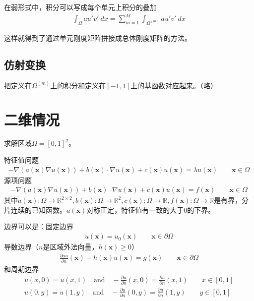 \documentclass[12pt,a4paper]{article}
\begin{document}
在弱形式中，积分可以写成每个单元上积分的叠加
\begin{align*}
\int_{\Omega} a u' v' \ dx = \sum_{m=1}^{M} \int_{\Omega^{(m)}} a u' v' \ dx
\end{align*}

这样就得到了通过单元刚度矩阵拼接成总体刚度矩阵的方法。

\subsection{仿射变换}

把定义在$\Omega^{(m)}$上的积分和定义在$[-1,1]$上的基函数对应起来。（略）







\section{二维情况}

求解区域$\Omega = [0,1]^2$。

特征值问题
\begin{align*}
- \nabla(a(\mathbf{x}) \nabla u(\mathbf{x})) + b(\mathbf{x}) \cdot \nabla u(\mathbf{x}) + c(\mathbf{x}) u(\mathbf{x}) = \lambda u(\mathbf{x}) \qquad \mathbf{x} \in \Omega
\end{align*}
源项问题
\begin{align*}
- \nabla(a(\mathbf{x}) \nabla u(\mathbf{x})) + b(\mathbf{x}) \cdot \nabla u(\mathbf{x}) + c(\mathbf{x}) u(\mathbf{x}) = f(\mathbf{\mathbf{x}}) \qquad \mathbf{x} \in \Omega
\end{align*}
其中$a(\mathbf{x}): \Omega \rightarrow \mathbb{R}^{2 \times 2}, b(\mathbf{x}): \Omega \rightarrow \mathbb{R}^{2}, c(\mathbf{x}): \Omega \rightarrow \mathbb{R}, f(\mathbf{x}): \Omega \rightarrow \mathbb{R}$是有界，分片连续的已知函数。$a(\mathbf{x})$对称正定，特征值有一致的大于0的下界。

边界可以是：固定边界
\begin{align*}
u(\mathbf{x}) = u_0(\mathbf{x}) \qquad \mathbf{x} \in \partial \Omega
\end{align*}
导数边界（$n$是区域外法向量，$h(\mathbf{x}) \geq 0$）
\begin{align*}
\frac{\partial a u}{\partial n}(\mathbf{x}) + h(\mathbf{x}) u(\mathbf{x}) = g(\mathbf{x}) \qquad \mathbf{x} \in \partial \Omega
\end{align*}
和周期边界
\begin{align*}
u(x, 0) = u(x, 1) \quad \text{and} \quad - \frac{\partial u}{\partial n}(x, 0) = \frac{\partial u}{\partial n}(x, 1) \qquad x \in [0, 1] \\
u(0, y) = u(1, y) \quad \text{and} \quad - \frac{\partial u}{\partial n}(0, y) = \frac{\partial u}{\partial n}(1, y) \qquad y \in [0, 1]
\end{align*}
\end{document}
